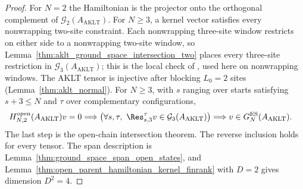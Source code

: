\begin{proof}
    \leanok
    For $N=2$ the Hamiltonian is the projector onto the orthogonal complement
    of $\mathcal G_{2}(A_{\mathrm{AKLT}})$. For $N\ge3$, a kernel vector
    satisfies every nonwrapping two-site constraint. Each nonwrapping
    three-site window restricts on either side to a nonwrapping two-site
    window, so Lemma~\ref{thm:aklt_ground_space_intersection_two} places
    every three-site restriction in $\mathcal G_{3}(A_{\mathrm{AKLT}})$; this
    is the local check of \cite[line~2095]{Cirac2021Matrix}, used here on
    nonwrapping windows. The AKLT tensor is injective after blocking
    $L_{0}=2$ sites (Lemma~\ref{thm:aklt_normal}). For $N\ge3$, with $s$
    ranging over starts satisfying $s+3\le N$ and $\tau$ over complementary
    configurations,
    \begin{align}
        H^{\mathrm{open}}_{N,2}(A_{\mathrm{AKLT}})v=0
         & \Longrightarrow
        \bigl(\forall s,\tau,\
        \Res^\tau_{s,3}v\in\mathcal G_3(A_{\mathrm{AKLT}})\bigr)
        \Longrightarrow v\in G_N^{\mathrm{ES}}(A_{\mathrm{AKLT}}).
        \notag
    \end{align}
    The last step is the open-chain intersection theorem.
    The reverse inclusion holds for every tensor. The span description is
    Lemma~\ref{thm:ground_space_span_open_states}, and
    Lemma~\ref{thm:open_parent_hamiltonian_kernel_finrank} with $D=2$ gives
    dimension $D^{2}=4$.
\end{proof}


